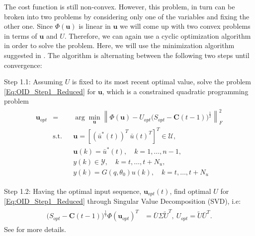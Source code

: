 \documentclass{ifacconf}
\begin{document}
The cost function is still non-convex. However, this problem, in turn can be broken into two problems by considering only one of the variables and fixing the other one. Since $\Phi(\textbf{u})$ is linear in $\textbf{u}$ we will come up with two convex problems in terms of $\textbf{u}$ and $U$. Therefore, we can again use a cyclic optimization algorithm in order to solve the problem. Here, we will use the minimization algorithm suggested in \cite{stoica2007}. The algorithm is alternating between the following two steps until convergence:
\begin{description}
\item{Step 1.1}: Assuming $U$ is fixed to its most recent optimal value, solve the problem \eqref{Eq:OID_Step1_Reduced} for $\textbf{u}$, which is a constrained quadratic programming problem
\vspace{-0.2cm}
\begin{eqnarray} \label{Eq:OID_Step1.1}
\begin{split}
\textbf{u}_{opt} &=&& \arg \min_{\textbf{u}}
								 \left \|
										 \Phi(\textbf{u}) - U_{opt} \big(S_{opt} - \textbf{C}(t-1) \big) ^{\frac{1}{2}} 
									\right \|_F^2\\
&\text{s.t.}
			      		&& \textbf{u} =\left[(\bar{u}^*(t))^T \ \bar{u}(t)^T \right]^T \in \mathcal{U},\\&&& \textbf{u}(k) = \bar{u}^*(t), \quad k = 1, \ldots, n-1,\\
						&&& y(k) \in \mathcal{Y}, \quad k = t, \ldots, t+N_u,\\
						&&& y(k) = G(q,\theta_0){u}(k)  , \quad k = t, \ldots,t + N_u
\end{split}
\end{eqnarray}
\item{Step 1.2}: Having the optimal input sequence, $\textbf{u}_{opt}(t)$, find optimal $U$ for \eqref{Eq:OID_Step1_Reduced} through Singular Value Decomposition (SVD), i.e:
\vspace{-0.1cm}
\begin{eqnarray} \label{Eq:SVD}
\begin{split}
(S_{opt} - \textbf{C}(t-1) \big) ^{\frac{1}{2}} \Phi(\textbf{u}_{opt})^T &= \bar{U}\Sigma \tilde{U}^T, \
																		U_{opt} = \tilde{U}\bar{U}^T.
\end{split}
\end{eqnarray}
See \cite{stoica2007} for more details.
\end{description}
\end{document}

